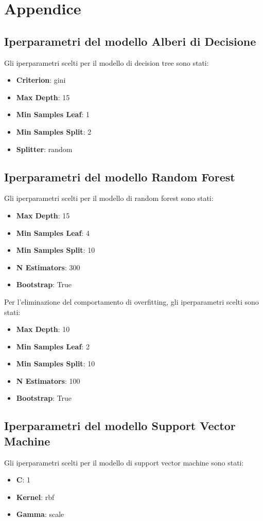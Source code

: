 \documentclass[../../Thesis.tex]{subfiles}
\begin{document}
\chapter*{Appendice}
\section*{Iperparametri del modello Alberi di Decisione}
Gli iperparametri scelti per il modello di decision tree sono stati: 
\begin{itemize}
    \item \textbf{Criterion}: gini
    \item \textbf{Max Depth}: 15
    \item \textbf{Min Samples Leaf}: 1
    \item \textbf{Min Samples Split}: 2
    \item \textbf{Splitter}: random
\end{itemize}

\section*{Iperparametri del modello Random Forest}

Gli iperparametri scelti per il modello di random forest sono stati:
\begin{itemize}
    \item \textbf{Max Depth}: 15
    \item \textbf{Min Samples Leaf}: 4
    \item \textbf{Min Samples Split}: 10
    \item \textbf{N Estimators}: 300
    \item \textbf{Bootstrap}: True
\end{itemize}
Per l'eliminazione del comportamento di overfitting, gli iperparametri scelti sono stati:
\begin{itemize}
    \item \textbf{Max Depth}: 10
    \item \textbf{Min Samples Leaf}: 2
    \item \textbf{Min Samples Split}: 10
    \item \textbf{N Estimators}: 100
    \item \textbf{Bootstrap}: True
\end{itemize}

\section*{Iperparametri del modello Support Vector Machine}
Gli iperparametri scelti per il modello di support vector machine sono stati:
\begin{itemize}
    \item \textbf{C}: 1
    \item \textbf{Kernel}: rbf
    \item \textbf{Gamma}: scale
\end{itemize}
\end{document}
